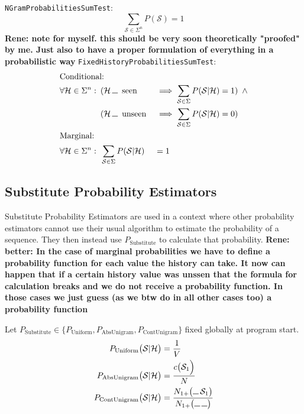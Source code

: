 \documentclass[11pt,a4paper]{article}
\newcommand{\Seq}{\mathcal{S}}
\newcommand{\Hist}{\mathcal{H}}
\newcommand{\Skp}{\rule{7pt}{.5pt}}
\newcommand{\rp}[1]{\textbf{Rene: #1}}
\begin{document}
  \texttt{NGramProbabilitiesSumTest}:
  \begin{equation}
    \sum_{\Seq \in \Sigma^n} P(\Seq) = 1
  \end{equation}
  \rp{note for myself. this should be very soon theoretically "proofed" by me.
  Just also to have a proper formulation of everything in a probabilistic way}
  \texttt{FixedHistoryProbabilitiesSumTest}:
  \begin{alignat}{2}
    \intertext{Conditional:}
    \forall \Hist \in \Sigma^n:
    \enspace&(\Hist \, \Skp \enspace \mathrm{seen} &&\implies \sum_{\Seq \in \Sigma} P(\Seq | \Hist) = 1) \enspace \land \\
    \enspace&(\Hist \, \Skp \enspace \mathrm{unseen} &&\implies \sum_{\Seq \in \Sigma} P(\Seq | \Hist) = 0) \notag \\
    \intertext{Marginal:}
    \forall \Hist \in \Sigma^n:
    \enspace&\sum_{\Seq \in \Sigma} P(\Seq | \Hist) &&= 1
  \end{alignat}

  \subsection{Substitute Probability Estimators}

  Substitute Probability Estimators are used in a context where other
  probability estimators cannot use their usual algorithm to estimate the
  probability of a sequence. They then instead use $P_\mathrm{Substitute}$ to
  calculate that probability.
  \rp{better: In the case of marginal probabilities we have to define a
  probability function for each value the history can take. It now can happen
  that if a certain history value was unssen that the formula for calculation
  breaks and we do not receive a probability function. In those cases we just
  guess (as we btw do in all other cases too) a probability function}

  Let $P_\mathrm{Substitute} \in \big\{ P_\mathrm{Uniform} , P_\mathrm{AbsUnigram} , P_\mathrm{ContUnigram}\big\}$
  fixed globally at program start.
  \begin{align}
    P_\mathrm{Uniform}\big(\Seq | \Hist\big) &= \frac{1}{V} \\
    P_\mathrm{AbsUnigram}\big(\Seq | \Hist\big) &= \frac{c\big(\Seq_1\Big)}{N} \\
    P_\mathrm{ContUnigram}\big(\Seq | \Hist\big) &= \frac{N_{1+}\big(\Skp \, \Seq_1\big)}{N_{1+}\big(\Skp \, \Skp\big)}
  \end{align}
\end{document}

